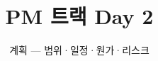 \documentclass[aspectratio=169,11pt,t]{beamer}
\title{PM 트랙 Day 2}
\subtitle{계획 — 범위·일정·원가·리스크}
\begin{document}
\begin{frame}[plain,c]
\titlepage
\end{frame}

\end{document}
